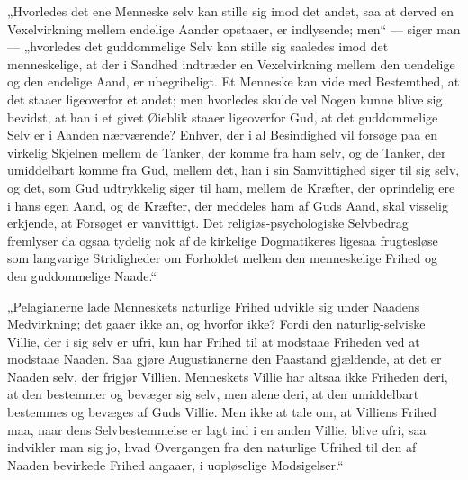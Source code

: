 \documentclass[12pt]{book}
\begin{document}
„Hvorledes det ene Menneske selv kan stille sig imod det andet, saa
at derved en Vexelvirkning mellem endelige Aander opstaaer, er
indlysende; men“ --- siger man --- „hvorledes det guddommelige Selv
kan stille sig saaledes imod det menneskelige, at der i Sandhed
indtræder en Vexelvirkning mellem den uendelige og den endelige
Aand, er ubegribeligt. Et Menneske kan vide med Bestemthed, at det
staaer ligeoverfor et andet; men hvorledes skulde vel Nogen kunne
blive sig bevidst, at han i et givet Øieblik staaer ligeoverfor Gud,
at det guddommelige Selv er i Aanden nærværende? Enhver, der i al
Besindighed vil forsøge paa en virkelig Skjelnen mellem de Tanker,
der komme fra ham selv, og de Tanker, der umiddelbart komme fra Gud,
mellem det, han i sin Samvittighed siger til sig selv, og det, som
Gud udtrykkelig siger til ham, mellem de Kræfter, der oprindelig ere
i hans egen Aand, og de Kræfter, der meddeles ham af Guds Aand, skal
visselig erkjende, at Forsøget er vanvittigt. Det
religiøs-psychologiske Selvbedrag fremlyser da ogsaa tydelig nok af
de kirkelige Dogmatikeres ligesaa frugtesløse som langvarige
Stridigheder om Forholdet mellem den menneskelige Frihed og den
guddommelige Naade.“

„Pelagianerne lade Menneskets naturlige Frihed udvikle sig under
Naadens Medvirkning; det gaaer ikke an, og hvorfor ikke? Fordi den
naturlig-selviske Villie, der i sig selv er ufri, kun har Frihed til
at modstaae Friheden ved at modstaae Naaden. Saa gjøre
Augustianerne den
Paastand gjældende, at det er Naaden selv, der frigjør Villien.
Menneskets Villie har altsaa ikke Friheden deri, at den bestemmer og
bevæger sig selv, men alene deri, at den umiddelbart bestemmes og
bevæges af Guds Villie. Men ikke at tale om, at Villiens Frihed maa,
naar dens Selvbestemmelse er lagt ind i en anden Villie, blive ufri,
saa indvikler man sig jo, hvad Overgangen fra den naturlige Ufrihed
til den af Naaden bevirkede Frihed angaaer, i uopløselige
Modsigelser.“
\end{document}
